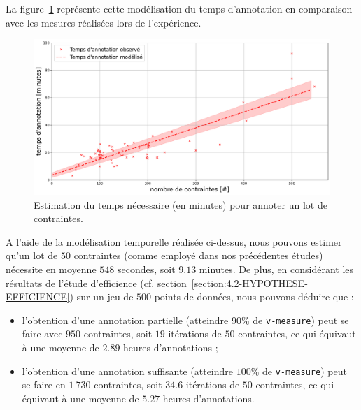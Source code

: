 			La figure~\ref{figure:4.3.1-ETUDE-COUTS-TEMPS-ANNOTATION-SIMULATION} représente cette modélisation du temps d'annotation en comparaison avec les mesures réalisées lors de l'expérience.
			\begin{figure}[!htb]
				\centering
				\includegraphics[width=\textwidth]{figures/etude-temps-annotation-1-modelisation-temps}
				\caption{Estimation du temps nécessaire (en minutes) pour annoter un lot de contraintes.}
				\label{figure:4.3.1-ETUDE-COUTS-TEMPS-ANNOTATION-SIMULATION}
			\end{figure}
		
			A l'aide de la modélisation temporelle réalisée ci-dessus, nous pouvons estimer qu'un lot de $50$ contraintes (comme employé dans nos précédentes études) nécessite en moyenne $548$ secondes, soit $9.13$ minutes.
			De plus, en considérant les résultats de l'étude d'efficience (cf. section~\ref{section:4.2-HYPOTHESE-EFFICIENCE}) sur un jeu de $500$ points de données, nous pouvons déduire que :
			\begin{itemize}
				\item l'obtention d'une annotation partielle (atteindre $90$\% de \texttt{v-measure}) peut se faire avec $950$ contraintes, soit $19$ itérations de $50$ contraintes, ce qui équivaut à une moyenne de $2.89$ heures d'annotations ;
				\item l'obtention d'une annotation suffisante (atteindre $100$\% de \texttt{v-measure}) peut se faire en $1~730$ contraintes, soit $34.6$ itérations de $50$ contraintes, ce qui équivaut à une moyenne de $5.27$ heures d'annotations.
			\end{itemize}
		

